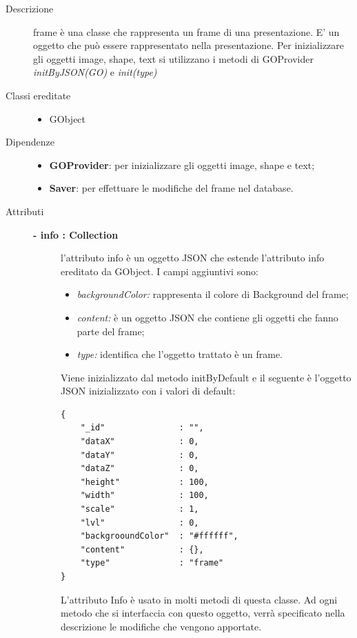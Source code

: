 \begin{description}
\item[Descrizione] \hfill
	frame è una classe che rappresenta un frame di una presentazione. E' un oggetto che può essere rappresentato nella presentazione. Per inizializzare gli oggetti image, shape, text si utilizzano i metodi di GOProvider \textit{initByJSON(GO)} e \textit{init(type)}
	
\item[Classi ereditate] \hfill
	\begin{itemize}
		\item GObject
	\end{itemize}

\item[Dipendenze] \hfill
	\begin{itemize}
		\item \textbf{GOProvider}: per inizializzare gli oggetti image, shape e text;
		\item \textbf{Saver}: per effettuare le modifiche del frame nel database.
	\end{itemize}

\item[Attributi] \hfill
	\begin{description}
		\item[\textbf{- info : Collection			}] \hfill
			l'attributo info è un oggetto JSON che estende l'attributo info ereditato da GObject. I campi aggiuntivi sono:
	\begin{itemize}
		\item \textit{backgroundColor:} rappresenta il colore di Background del frame;
		\item \textit{content:} è un oggetto JSON che contiene gli oggetti che fanno parte del frame;
		\item \textit{type:} identifica che l'oggetto trattato è un frame.
	\end{itemize}
	
	Viene inizializzato dal metodo initByDefault e il seguente è l'oggetto JSON inizializzato con i valori di default:
\begin{lstlisting}
{
    "_id"               : "",
    "dataX"             : 0,
    "dataY"             : 0,
    "dataZ"             : 0,
    "height"            : 100,
    "width"             : 100,
    "scale"             : 1,
    "lvl"               : 0,
    "backgrooundColor"  : "#ffffff",
    "content"           : {},
    "type"              : "frame"
}
\end{lstlisting}					
                 L'attributo Info è usato in molti metodi di questa classe. Ad ogni metodo che si interfaccia con questo oggetto, verrà specificato nella descrizione le modifiche che vengono apportate. 	
	

\end{description}
\end{description}
